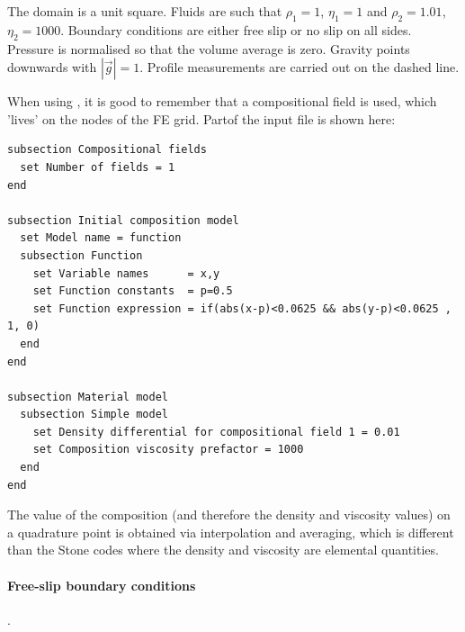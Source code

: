 
The domain is a unit square. Fluids are such that 
$\rho_1=1$, $\eta_1=1$ and $\rho_2=1.01$, $\eta_2=1000$.
Boundary conditions are either free slip or no slip on all sides. 
Pressure is normalised so that the volume average is zero. 
Gravity points downwards with $|\vec{g}|=1$.
Profile measurements are carried out on the dashed line.


\begin{center}

\end{center}

When using \aspect{}, it is good to remember that a compositional field is used, 
which 'lives' on the nodes of the FE grid. Partof the input file is shown here: 

\begin{verbatim}
subsection Compositional fields
  set Number of fields = 1 
end 

subsection Initial composition model
  set Model name = function
  subsection Function
    set Variable names      = x,y 
    set Function constants  = p=0.5
    set Function expression = if(abs(x-p)<0.0625 && abs(y-p)<0.0625 , 1, 0)
  end 
end

subsection Material model
  subsection Simple model
    set Density differential for compositional field 1 = 0.01
    set Composition viscosity prefactor = 1000
  end 
end
\end{verbatim}

The value of the composition (and therefore 
the density and viscosity values) on a quadrature point is obtained via interpolation 
and averaging, which is different than the Stone codes where the density 
and viscosity are elemental quantities.

\newpage
\paragraph{Free-slip boundary conditions}.

